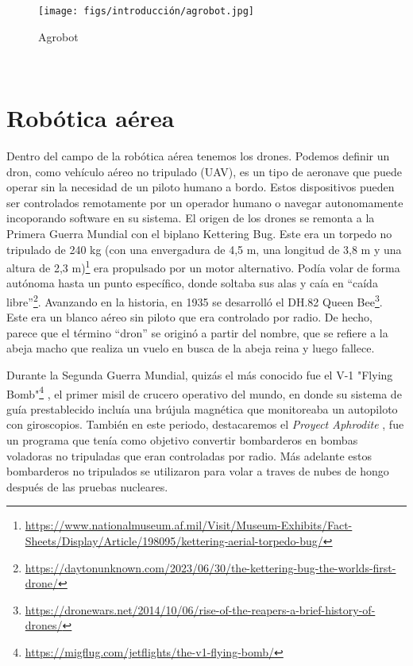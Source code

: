 \begin{figure} [H]
  \begin{center}
    \texttt{[image: figs/introducción/agrobot.jpg]}
  \end{center}
  \caption{Agrobot}
  \label{fig:Agrobot}
\end{figure}\

\section{Robótica aérea}
\label{sec:subseccion}

Dentro del campo de la robótica aérea tenemos los drones. Podemos definir un dron, como vehículo aéreo no tripulado (UAV), es un tipo de aeronave que puede operar sin la 
necesidad de un piloto humano a bordo. Estos dispositivos pueden ser controlados remotamente por un operador humano o navegar autonomamente incoporando software 
en su sistema. 
El origen de los drones se remonta a la Primera Guerra Mundial con el biplano Kettering Bug.
Este era un torpedo no tripulado de 240 kg (con una envergadura de 4,5 m, una longitud de
3,8 m y una altura de 2,3 m)\footnote{\url{https://www.nationalmuseum.af.mil/Visit/Museum-Exhibits/Fact-Sheets/Display/Article/198095/kettering-aerial-torpedo-bug/}} era propulsado por un motor alternativo. Podía volar de
forma autónoma hasta un punto específico, donde soltaba sus alas y caía en “caída libre”\footnote{\url{https://daytonunknown.com/2023/06/30/the-kettering-bug-the-worlds-first-drone/}}.
Avanzando en la historia, en 1935 se desarrolló el DH.82 Queen Bee\footnote{\url{https://dronewars.net/2014/10/06/rise-of-the-reapers-a-brief-history-of-drones/}}. Este era un blanco aéreo sin piloto que era controlado por radio. De hecho, parece que el término “dron” se originó a partir del nombre, que se refiere a la abeja macho que realiza un vuelo en busca de la abeja reina y luego fallece. \newline

Durante la Segunda Guerra Mundial, quizás el más conocido fue el V-1 "Flying Bomb"\footnote{\url{https://migflug.com/jetflights/the-v1-flying-bomb/}} , el primer misil
de crucero operativo del mundo, en donde su sistema de guía prestablecido incluía una brújula magnética que monitoreaba un autopiloto con giroscopios. También en este periodo, destacaremos el \textit{Proyect Aphrodite} \cite{Aphrodite}, fue un programa que tenía como objetivo convertir bombarderos en bombas voladoras no tripuladas que eran controladas por radio. Más adelante estos bombarderos no tripulados se utilizaron para volar a traves de nubes de hongo
después de las pruebas nucleares. \newline

